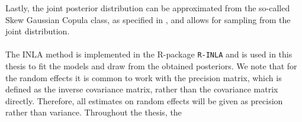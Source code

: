 Lastly, the joint posterior distribution can be approximated from the so-called Skew Gaussian Copula class, as specified in \citet{rue2021joint}, and allows for sampling from the joint distribution.
\\
\\
The INLA method is implemented in the R-package \texttt{R-INLA} \citep{gomezrubio2020inla} and is used in this thesis to fit the models and draw from the obtained posteriors. We note that for the random effects it is common to work with the precision matrix, which is defined as the inverse covariance matrix, rather than the covariance matrix directly. Therefore, all estimates on random effects will be given as precision rather than variance. Throughout the thesis, the 
\\ 
\\ 

